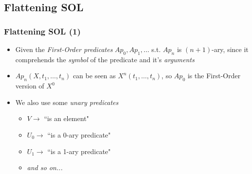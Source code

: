 \documentclass{beamer}
\begin{document}
            \subsection{Flattening SOL}
                \begin{frame}
                    \frametitle{Flattening SOL (1)}
                    \begin{itemize}
                        \item Given the \textit{First-Order predicates} $ Ap_0, Ap_1, \dots $ s.t. $ Ap_n $ is $ (n + 1) $-ary, since it comprehends the \textit{symbol} of the predicate and it's \textit{arguments}
                        \item $ Ap_n(X, t_1, \dots, t_n) $ can be seen as $ X^n(t_1, \dots, t_n) $, so $ Ap_0 $ is the First-Order version of $ X^0 $
                        \item We also use some \textit{unary predicates}
                              \begin{itemize}
                                \item $ V \rightarrow $ ``is an element"
                                \item $ U_0 \rightarrow $ ``is a 0-ary predicate"
                                \item $ U_1 \rightarrow $ ``is a 1-ary predicate"
                                \item \textit{and so on...}
                              \end{itemize}
                    \end{itemize}
                \end{frame}
\end{document}
